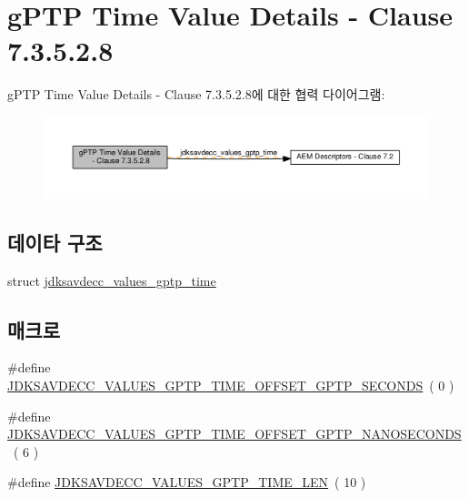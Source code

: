 \hypertarget{group__values__gptp__time}{}\section{g\+P\+TP Time Value Details -\/ Clause 7.3.5.2.8}
\label{group__values__gptp__time}
g\+P\+TP Time Value Details -\/ Clause 7.3.5.2.8에 대한 협력 다이어그램\+:
\nopagebreak
\begin{figure}[H]
\begin{center}
\leavevmode
\includegraphics[width=350pt]{group__values__gptp__time}
\end{center}
\end{figure}
\subsection*{데이타 구조}
\begin{DoxyCompactItemize}
\item 
struct \hyperlink{structjdksavdecc__values__gptp__time}{jdksavdecc\+\_\+values\+\_\+gptp\+\_\+time}
\end{DoxyCompactItemize}
\subsection*{매크로}
\begin{DoxyCompactItemize}
\item 
\#define \hyperlink{group__values__gptp__time_ga28bd999ee435e892c3ce256dfdb5cde9}{J\+D\+K\+S\+A\+V\+D\+E\+C\+C\+\_\+\+V\+A\+L\+U\+E\+S\+\_\+\+G\+P\+T\+P\+\_\+\+T\+I\+M\+E\+\_\+\+O\+F\+F\+S\+E\+T\+\_\+\+G\+P\+T\+P\+\_\+\+S\+E\+C\+O\+N\+DS}~( 0 )
\item 
\#define \hyperlink{group__values__gptp__time_ga0ff7c38cf1d92833d016826d0e36c6f7}{J\+D\+K\+S\+A\+V\+D\+E\+C\+C\+\_\+\+V\+A\+L\+U\+E\+S\+\_\+\+G\+P\+T\+P\+\_\+\+T\+I\+M\+E\+\_\+\+O\+F\+F\+S\+E\+T\+\_\+\+G\+P\+T\+P\+\_\+\+N\+A\+N\+O\+S\+E\+C\+O\+N\+DS}~( 6 )
\item 
\#define \hyperlink{group__values__gptp__time_ga78c1703ccda95c5b83f9cbcd68bcca08}{J\+D\+K\+S\+A\+V\+D\+E\+C\+C\+\_\+\+V\+A\+L\+U\+E\+S\+\_\+\+G\+P\+T\+P\+\_\+\+T\+I\+M\+E\+\_\+\+L\+EN}~( 10 )
\end{DoxyCompactItemize}
